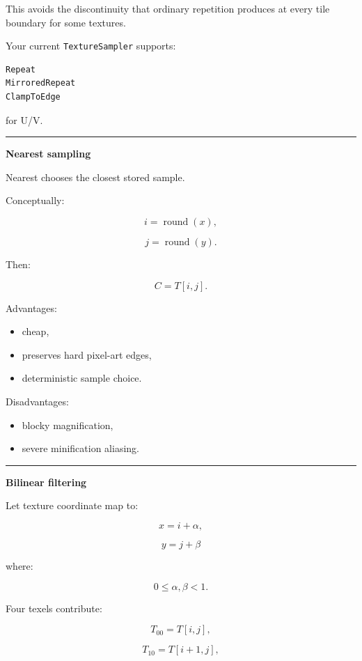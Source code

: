 This avoids the discontinuity that ordinary repetition produces at every tile boundary for some textures.

Your current \texttt{TextureSampler} supports:

\begin{verbatim}
Repeat
MirroredRepeat
ClampToEdge
\end{verbatim}

for U/V.

\begin{center}\rule{0.5\linewidth}{0.5pt}\end{center}

\textbf{Nearest sampling}

Nearest chooses the closest stored sample.

Conceptually:

\[
i=\operatorname{round}(x),
\]

\[
j=\operatorname{round}(y).
\]

Then:

\[
C=T[i,j].
\]

Advantages:

\begin{itemize}
\tightlist
\item
  cheap,
\item
  preserves hard pixel-art edges,
\item
  deterministic sample choice.
\end{itemize}

Disadvantages:

\begin{itemize}
\tightlist
\item
  blocky magnification,
\item
  severe minification aliasing.
\end{itemize}

\begin{center}\rule{0.5\linewidth}{0.5pt}\end{center}

\textbf{Bilinear filtering}

Let texture coordinate map to:

\[
x=i+\alpha,
\]

\[
y=j+\beta
\]

where:

\[
0\le\alpha,\beta<1.
\]

Four texels contribute:

\[
T_{00}=T[i,j],
\]

\[
T_{10}=T[i+1,j],
\]

